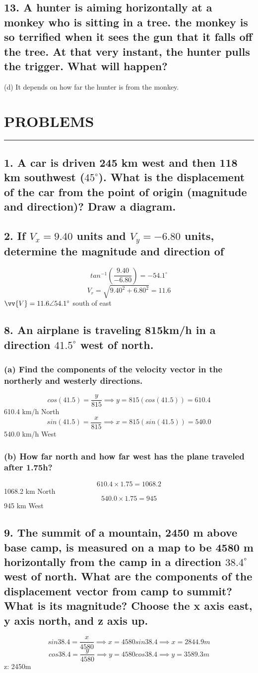 \documentclass[12pt,a4paper,english]{article}
\newcommand{\degree}[1]{${#1}^\circ$}
\begin{document}
\begin{flushleft}
  \subsection{13. A hunter is aiming horizontally at a monkey who is sitting in a tree. the monkey is so terrified when it sees the gun that it falls off the tree. At that very instant, the hunter pulls the trigger. What will happen?}
  (d) It depends on how far the hunter is from the monkey.
  \pagebreak
  \section*{PROBLEMS}
  \hrule
  \subsection{1. A car is driven 245 km west and then 118 km southwest (\degree{45}). What is the displacement of the car from the point of origin (magnitude and direction)? Draw a diagram.}
  \subsection{2. If $V_x=9.40$ units and $V_y=-6.80$ units, determine the magnitude and direction of }
  \[
    tan^{-1}(\frac{9.40}{-6.80})=-54.1^\circ
  \]
  \[
    V_r=\sqrt{9.40^2+6.80^2}=11.6
  \]
    $\vv{V}=11.6 \angle 54.1^\circ$ south of east
  \subsection{8. An airplane is traveling 815km/h in a direction \degree{41.5} west of north.}
  \subsubsection{(a) Find the components of the velocity vector in the northerly and westerly directions.}
  \[
    cos(41.5)=\frac{y}{815} \implies y=815(cos(41.5))=610.4
  \]
  610.4 km/h North
  \[
    sin(41.5)=\frac{x}{815} \implies x=815(sin(41.5)) = 540.0
  \]
  540.0 km/h West
  \subsubsection{(b) How far north and how far west has the plane traveled after 1.75h?}
  \[
    610.4\times 1.75=1068.2
  \]
1068.2 km North
\[
  540.0\times 1.75=945
\]
945 km West
  \subsection{9. The summit of a mountain, 2450 m above base camp, is measured on a map to be 4580 m horizontally from the camp in a direction \degree{38.4} west of north. What are the components of the displacement vector from camp to summit? What is its magnitude? Choose the x axis east, y axis north, and z axis up.}
  \[
    sin38.4=\frac{x}{4580}\implies
    x=4580sin38.4\implies
    x=2844.9m
  \]
  \[
    cos38.4=\frac{y}{4580}\implies
    y=4580cos38.4\implies
    y=3589.3m
  \]
  z: 2450m


\end{flushleft}
\end{document}
